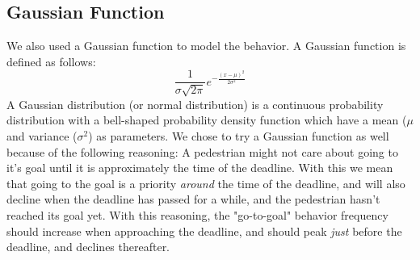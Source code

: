 \documentclass[11pt]{book}
\begin{document}
\subsection{Gaussian Function}
We also used a Gaussian function to model the behavior. A Gaussian function is defined as follows:
\begin{equation}\frac{1}{\sigma \sqrt{2 \pi}} e^{- \frac{(x - \mu)^2}{2\sigma^2}}
\end{equation}
A Gaussian distribution (or normal distribution) is a continuous probability distribution with a bell-shaped probability density function which have a mean ($\mu$ and variance ($\sigma^2$) as parameters.
We chose to try a Gaussian function as well because of the following reasoning: A pedestrian might not care about going to it's goal until it is approximately the time of the deadline. With this we mean that going to the goal is a priority \emph{around} the time of the deadline, and will also decline when the deadline has passed for a while, and the pedestrian hasn't reached its goal yet. With this reasoning, the "go-to-goal" behavior frequency should increase when approaching the deadline, and should peak \emph{just} before the deadline, and declines thereafter.
\end{document}
